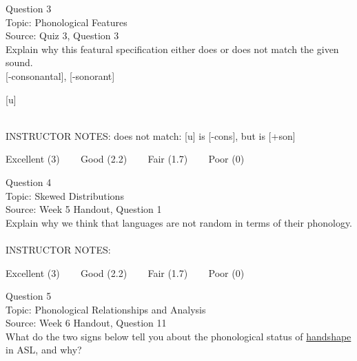 \documentclass[12pt]{article}
\begin{document}
{\large Question 3}\\

Topic: Phonological Features\\
Source: Quiz 3, Question 3\\

Explain why this featural specification either does or does not match the given sound.\\

{[-consonantal]}, {[-sonorant]}

{[u]}


~\\
INSTRUCTOR NOTES: does not match: [u] is [-cons], but is [+son]


\vfill
Excellent (3) ~~~ Good (2.2) ~~~ Fair (1.7) ~~~ Poor (0)
\newpage

{\large Question 4}\\

Topic: Skewed Distributions\\
Source: Week 5 Handout, Question 1\\

Explain why we think that languages are not random in terms of their phonology.\\


~\\
INSTRUCTOR NOTES: 


\vfill
Excellent (3) ~~~ Good (2.2) ~~~ Fair (1.7) ~~~ Poor (0)
\newpage

{\large Question 5}\\

Topic: Phonological Relationships and Analysis\\
Source: Week 6 Handout, Question 11\\

What do the two signs below tell you about the phonological status of \underline{handshape} in ASL, and why?\\
\end{document}
